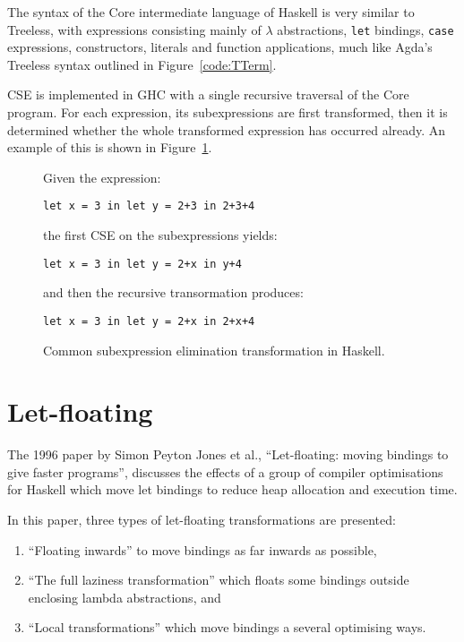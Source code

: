 The syntax of the Core intermediate language of Haskell is very similar to Treeless, with expressions consisting mainly of $\lambda$ abstractions, \lstinline{let} bindings, \lstinline{case} expressions, constructors, literals and function applications, much like Agda's Treeless syntax outlined in Figure~\ref{code:TTerm}.

CSE is implemented in GHC with a single recursive traversal of the Core program. For each expression, its subexpressions are first transformed, then it is determined whether the whole transformed expression has occurred already.\cite{chitil1997} An example of this is shown in Figure~\ref{code:cse_haskell}.

\begin{figure}[h]
Given the expression:

\lstinline{let x = 3 in let y = 2+3 in 2+3+4}

the first CSE on the subexpressions yields:

\lstinline{let x = 3 in let y = 2+x in y+4}

and then the recursive transormation produces:

\lstinline{let x = 3 in let y = 2+x in 2+x+4}

\caption{Common subexpression elimination transformation in Haskell.\cite{chitil1997}}
\label{code:cse_haskell}
\end{figure}

\section{Let-floating}

The 1996 paper by Simon Peyton Jones et al., ``Let-floating: moving bindings to give faster programs'', discusses the effects of a group of compiler optimisations for Haskell which move let bindings to reduce heap allocation and execution time.\cite{jones1996}

In this paper, three types of let-floating transformations are presented:
\begin{enumerate}
\item ``Floating inwards'' to move bindings as far inwards as possible,
\item ``The full laziness transformation'' which floats some bindings outside enclosing lambda abstractions, and
\item ``Local transformations'' which move bindings a several optimising ways.\cite{jones1996}
\end{enumerate}

